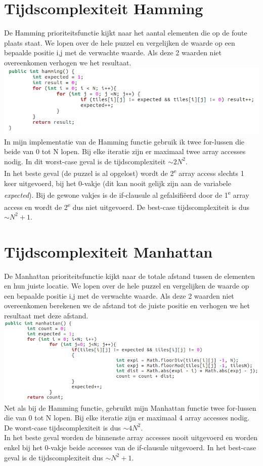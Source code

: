 \documentclass[11pt, a4paper]{article}
\begin{document}
\section*{Tijdscomplexiteit Hamming}
De Hamming prioriteitsfunctie kijkt naar het aantal elementen die op de foute plaats staat. We lopen over de hele puzzel en vergelijken de waarde op een bepaalde positie i,j met de verwachte waarde. Als deze 2 waarden niet overeenkomen verhogen we het resultaat.\\
\includegraphics[width=\textwidth]{hamming}\\
In mijn implementatie van de Hamming functie gebruik ik twee for-lussen die beide van 0 tot N lopen. Bij elke iteratie zijn er maximaal twee array accesses nodig. In dit worst-case geval is de tijdscomplexiteit $\sim 2N^2$.\\
In het beste geval (de puzzel is al opgelost) wordt de 2\textsuperscript{e} array access slechts 1 keer uitgevoerd, bij het 0-vakje (dit kan nooit gelijk zijn aan de variabele \emph{expected}). Bij de gewone vakjes is de if-clausule al gefalsifi\"eerd door de 1\textsuperscript{e} array access en wordt de 2\textsuperscript{e} dus niet uitgevoerd. De best-case tijdscomplexiteit is dus $\sim N^2 + 1$.
\section*{Tijdscomplexiteit Manhattan}
De Manhattan prioriteitsfunctie kijkt naar de totale afstand tussen de elementen en hun juiste locatie. We lopen over de hele puzzel en vergelijken de waarde op een bepaalde positie i,j met de verwachte waarde. Als deze 2 waarden niet overeenkomen berekenen we de afstand tot de juiste positie en verhogen we het resultaat met deze afstand.\vspace*{10px}
\includegraphics[width=\textwidth]{manhattan}\\
\vspace*{10px}
Net als bij de Hamming functie, gebruikt mijn Manhattan functie twee for-lussen die van 0 tot N lopen. Bij elke iteratie zijn er maximaal 4 array accesses nodig. De worst-case tijdscomplexiteit is dus $\sim 4N^2$.\\
In het beste geval worden de binnenste array accesses nooit uitgevoerd en worden enkel bij het 0-vakje beide accesses van de if-clausule uitgevoerd. In het best-case geval is de tijdscomplexiteit dus $\sim N^2 + 1$.
\end{document}
